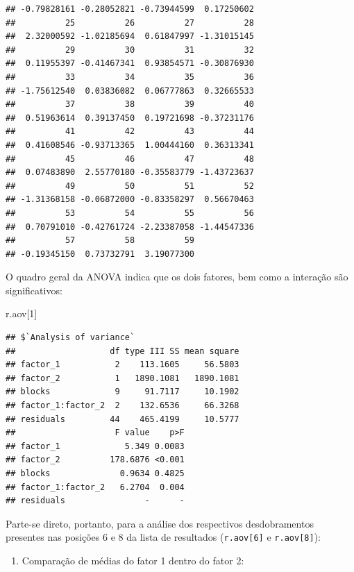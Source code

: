 \documentclass[
]{article}
\newenvironment{Shaded}{\begin{snugshade}}{\end{snugshade}}
\newcommand{\DecValTok}[1]{\textcolor[rgb]{0.00,0.00,0.81}{#1}}
\newcommand{\NormalTok}[1]{#1}
\providecommand{\tightlist}{%
  \setlength{\itemsep}{0pt}\setlength{\parskip}{0pt}}
\begin{document}
\begin{verbatim}
## -0.79828161 -0.28052821 -0.73944599  0.17250602 
##          25          26          27          28 
##  2.32000592 -1.02185694  0.61847997 -1.31015145 
##          29          30          31          32 
##  0.11955397 -0.41467341  0.93854571 -0.30876930 
##          33          34          35          36 
## -1.75612540  0.03836082  0.06777863  0.32665533 
##          37          38          39          40 
##  0.51963614  0.39137450  0.19721698 -0.37231176 
##          41          42          43          44 
##  0.41608546 -0.93713365  1.00444160  0.36313341 
##          45          46          47          48 
##  0.07483890  2.55770180 -0.35583779 -1.43723637 
##          49          50          51          52 
## -1.31368158 -0.06872000 -0.83358297  0.56670463 
##          53          54          55          56 
##  0.70791010 -0.42761724 -2.23387058 -1.44547336 
##          57          58          59 
## -0.19345150  0.73732791  3.19077300
\end{verbatim}

O quadro geral da ANOVA indica que os dois fatores, bem como a interação são significativos:

\begin{Shaded}
\begin{Highlighting}[]
\NormalTok{r.aov[}\DecValTok{1}\NormalTok{]}
\end{Highlighting}
\end{Shaded}

\begin{verbatim}
## $`Analysis of variance`
##                   df type III SS mean square
## factor_1           2    113.1605     56.5803
## factor_2           1   1890.1081   1890.1081
## blocks             9     91.7117     10.1902
## factor_1:factor_2  2    132.6536     66.3268
## residuals         44    465.4199     10.5777
##                    F value    p>F
## factor_1             5.349 0.0083
## factor_2          178.6876 <0.001
## blocks              0.9634 0.4825
## factor_1:factor_2   6.2704  0.004
## residuals                -      -
\end{verbatim}

Parte-se direto, portanto, para a análise dos respectivos desdobramentos presentes nas posições 6 e 8 da lista de resultados (\texttt{r.aov{[}6{]}} e \texttt{r.aov{[}8{]}}):

\begin{enumerate}
\def\labelenumi{\arabic{enumi}.}
\tightlist
\item
  Comparação de médias do fator 1 dentro do fator 2:
\end{enumerate}
\end{document}
